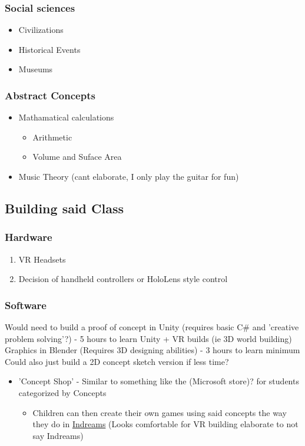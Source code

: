 \documentclass[landscape,a4paper,]{beamer}
\begin{document}
\subsubsection{Social sciences}
\label{sec:orgc2e3ee9}
\begin{itemize}
\item Civilizations
\item Historical Events
\item Museums
\end{itemize}

\subsubsection{Abstract Concepts}
\label{sec:orgcd0d208}
\begin{itemize}
\item Mathamatical calculations
\begin{itemize}
\item Arithmetic
\item Volume and Suface Area
\end{itemize}
\item Music Theory (cant elaborate, I only play the guitar for fun)
\end{itemize}

\subsection{Building said Class}
\label{sec:orgea5c8bf}
\subsubsection{Hardware}
\label{sec:orge8e7469}
\begin{enumerate}
\item VR Headsets
\item Decision of handheld controllers or HoloLens style control
\end{enumerate}
\subsubsection{Software}
\label{sec:org1393ba9}
Would need to build a proof of concept in Unity (requires basic C\# and 'creative problem solving'?) - 5 hours to learn Unity + VR builds (ie 3D world building)
    Graphics in Blender (Requires 3D designing abilities) - 3 hours to learn minimum
    Could also just build a 2D concept sketch version if less time?

\begin{itemize}
\item 'Concept Shop' - Similar to something like the (Microsoft store)? for students categorized by Concepts
\begin{itemize}
\item Children can then create their own games using said concepts the way they do in \href{https:https://indreams.me/}{Indreams} (Looks comfortable for VR building elaborate to not say Indreams)
\end{itemize}
\end{itemize}
\end{document}

